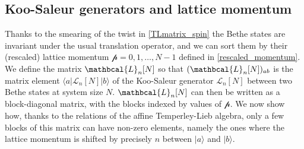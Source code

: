 \documentclass[a4paper,10pt]{article}
\newcommand{\hubert}[1]{$\framebox{\tiny h}$\ \textbf{\texttt{{\color{blue}\footnotesize#1}}}}
\newcommand{\linnea}[1]{$\framebox{\tiny L}$\ \textbf{\texttt{{\color{red}\footnotesize#1}}}}
\newcommand{\Pscaled}{{\mathcal p}}
\newcommand{\KSgen}{\mathcal{L}}
\newcommand{\LnMat}[1]{\mathbcal{L}_{#1}}
\begin{document}





\subsection{Koo-Saleur generators and lattice momentum}\label{KSandLatticeMomentum}

Thanks to the smearing of the twist in \eqref{TLmatrix_spin} the Bethe states are invariant under the usual translation operator, and we can sort them by their (rescaled) lattice momentum $\Pscaled = 0,1, \hdots , N-1$ defined in \eqref{rescaled_momentum}. We define the matrix $\LnMat{n}[N]$ so that $(\LnMat{n}[N])_{ab}$ is the matrix element $\langle a | \KSgen_n [N] |b\rangle$ of the Koo-Saleur generator $\KSgen_n[N]$ between two Bethe states at system size $N$. $\LnMat{n}[N]$ can then be written as a block-diagonal matrix, with the blocks indexed by values of $\Pscaled$. We now show how, thanks to the relations of the affine Temperley-Lieb algebra, only a few blocks of this matrix can have non-zero elements, namely the ones where the lattice momentum is shifted by precisely $n$ between $|a\rangle$ and $|b\rangle$. 
\end{document}
